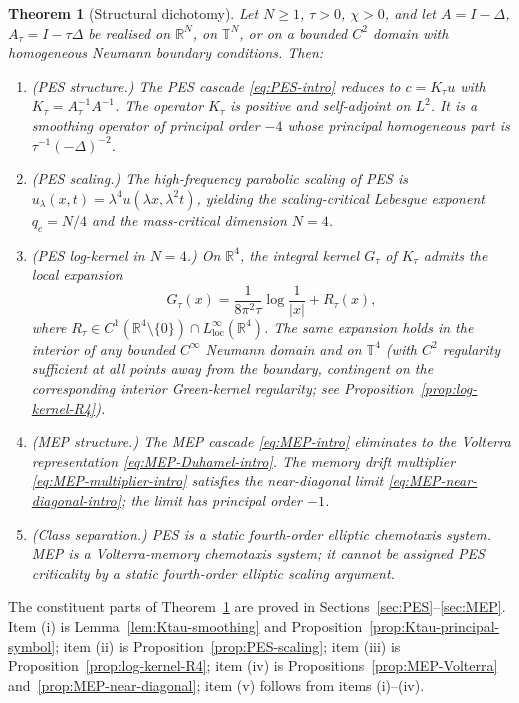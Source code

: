 \documentclass[11pt,reqno]{amsart}
\newtheorem{theorem}{Theorem}[section]
\theoremstyle{definition}
\theoremstyle{remark}
\newcommand{\R}{\mathbb{R}}
\newcommand{\T}{\mathbb{T}}
\newcommand{\loc}{\mathrm{loc}}
\begin{document}
\begin{theorem}[Structural dichotomy]\label{thm:main}
Let $N\ge 1$, $\tau>0$, $\chi>0$, and let $A=I-\Delta$, $A_\tau=I-\tau\Delta$ be realised on $\R^{N}$, on $\T^{N}$, or on a bounded $C^{2}$ domain with homogeneous Neumann boundary conditions. Then:
\begin{enumerate}[label=(\roman*),leftmargin=2em]
\item \textup{(PES structure.)} The PES cascade \eqref{eq:PES-intro} reduces to $c=K_\tau u$ with $K_\tau=A_\tau^{-1}A^{-1}$. The operator $K_\tau$ is positive and self-adjoint on $L^{2}$. It is a smoothing operator of principal order $-4$ whose principal homogeneous part is $\tau^{-1}(-\Delta)^{-2}$.
\item \textup{(PES scaling.)} The high-frequency parabolic scaling of PES is $u_\lambda(x,t)=\lambda^{4}u(\lambda x,\lambda^{2}t)$, yielding the scaling-critical Lebesgue exponent $q_c=N/4$ and the mass-critical dimension $N=4$.
\item \textup{(PES log-kernel in $N=4$.)} On $\R^{4}$, the integral kernel $G_\tau$ of $K_\tau$ admits the local expansion
\[
        G_\tau(x)=\frac{1}{8\pi^{2}\tau}\log\frac{1}{|x|}+R_\tau(x),
\]
where $R_\tau\in C^{1}(\R^{4}\setminus\{0\})\cap L^{\infty}_{\loc}(\R^{4})$. The same expansion holds in the interior of any bounded $C^{\infty}$ Neumann domain and on $\T^{4}$ \emph{(}with $C^{2}$ regularity sufficient at all points away from the boundary, contingent on the corresponding interior Green-kernel regularity; see Proposition~\ref{prop:log-kernel-R4}\emph{)}.
\item \textup{(MEP structure.)} The MEP cascade \eqref{eq:MEP-intro} eliminates to the Volterra representation \eqref{eq:MEP-Duhamel-intro}. The memory drift multiplier \eqref{eq:MEP-multiplier-intro} satisfies the near-diagonal limit \eqref{eq:MEP-near-diagonal-intro}; the limit has principal order $-1$.
\item \textup{(Class separation.)} PES is a static fourth-order elliptic chemotaxis system. MEP is a Volterra-memory chemotaxis system; it cannot be assigned PES criticality by a static fourth-order elliptic scaling argument.
\end{enumerate}
\end{theorem}

The constituent parts of Theorem~\ref{thm:main} are proved in Sections~\ref{sec:PES}--\ref{sec:MEP}. Item (i) is Lemma~\ref{lem:Ktau-smoothing} and Proposition~\ref{prop:Ktau-principal-symbol}; item (ii) is Proposition~\ref{prop:PES-scaling}; item (iii) is Proposition~\ref{prop:log-kernel-R4}; item (iv) is Propositions~\ref{prop:MEP-Volterra} and~\ref{prop:MEP-near-diagonal}; item (v) follows from items (i)--(iv).
\end{document}
